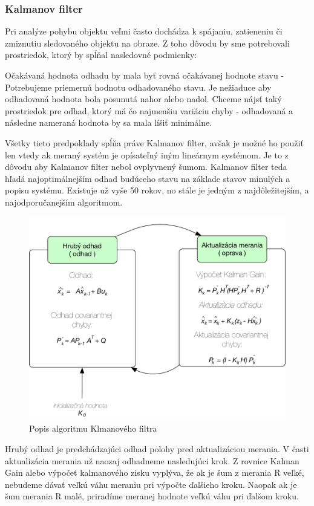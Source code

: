 \subsubsection{Kalmanov filter}
Pri analýze pohybu objektu veľmi často dochádza k spájaniu, zatieneniu či zmiznutiu sledovaného  objektu na obraze. Z toho dôvodu by sme potrebovali prostriedok, ktorý by spĺňal nasledovné podmienky: 


Očakávaná hodnota odhadu by mala byť rovná očakávanej hodnote stavu - Potrebujeme priemernú hodnotu odhadovaného stavu. Je nežiaduce aby odhadovaná hodnota bola posunutá nahor alebo nadol. 
Chceme nájsť taký prostriedok pre odhad, ktorý má čo najmenšiu variáciu chyby - odhadovaná a následne nameraná hodnota by sa mala líšiť minimálne. 



Všetky tieto predpoklady spĺňa práve Kalmanov filter, avšak je možné ho použiť len vtedy ak  meraný systém je opísateľný iným lineárnym systémom. Je to z dôvodu aby Kalmanov filter nebol ovplyvnený šumom. Kalmanov filter teda hľadá najoptimálnejším odhad budúceho stavu na základe stavov minulých a popisu systému.  Existuje už vyše 50 rokov, no stále je jedným z najdôležitejším, a najodporučanejším algoritmom.

\begin{figure}[H]
\begin{center}
	\includegraphics[scale=0.6]{obrazky/kalman}
	\caption{Popis algoritmu Klmanového filtra}
	\end{center}
\end{figure}

Hrubý odhad je predchádzajúci odhad polohy pred aktualizáciou merania. V časti aktualizácia merania už naozaj odhadneme nasledujúci krok. Z rovnice Kalman Gain alebo výpočet kalmanového zisku vyplýva, že ak je šum z merania R veľké, nebudeme dávať veľkú váhu meraniu pri výpočte ďalšieho kroku. Naopak ak je šum merania R malé, priradíme meranej hodnote veľkú váhu pri ďalšom kroku.  